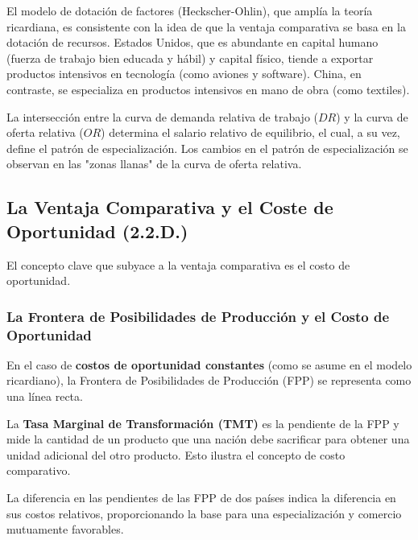 El modelo de dotación de factores (Heckscher-Ohlin), que amplía la teoría ricardiana, es consistente con la idea de que la ventaja comparativa se basa en la dotación de recursos. Estados Unidos, que es abundante en capital humano (fuerza de trabajo bien educada y hábil) y capital físico, tiende a exportar productos intensivos en tecnología (como aviones y software). China, en contraste, se especializa en productos intensivos en mano de obra (como textiles).

La intersección entre la curva de demanda relativa de trabajo ($DR$) y la curva de oferta relativa ($OR$) determina el salario relativo de equilibrio, el cual, a su vez, define el patrón de especialización. Los cambios en el patrón de especialización se observan en las "zonas llanas" de la curva de oferta relativa.

\subsection{La Ventaja Comparativa y el Coste de Oportunidad (2.2.D.)}
El concepto clave que subyace a la ventaja comparativa es el costo de oportunidad.

\subsubsection{La Frontera de Posibilidades de Producción y el Costo de Oportunidad}
En el caso de \textbf{costos de oportunidad constantes} (como se asume en el modelo ricardiano), la Frontera de Posibilidades de Producción (FPP) se representa como una línea recta.

\begin{definicion}
La \textbf{Tasa Marginal de Transformación (TMT)} es la pendiente de la FPP y mide la cantidad de un producto que una nación debe sacrificar para obtener una unidad adicional del otro producto. Esto ilustra el concepto de costo comparativo.
\end{definicion}

La diferencia en las pendientes de las FPP de dos países indica la diferencia en sus costos relativos, proporcionando la base para una especialización y comercio mutuamente favorables.

